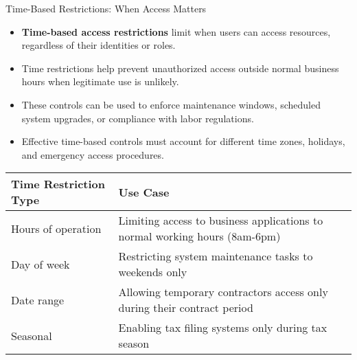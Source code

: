 \documentclass{beamer}
\begin{document}
\begin{frame}{Time-Based Restrictions: When Access Matters}
    \begin{itemize}
        \item \textbf{Time-based access restrictions} limit when users can access resources, regardless of their identities or roles.
        \item Time restrictions help prevent unauthorized access outside normal business hours when legitimate use is unlikely.
        \item These controls can be used to enforce maintenance windows, scheduled system upgrades, or compliance with labor regulations.
        \item Effective time-based controls must account for different time zones, holidays, and emergency access procedures.
    \end{itemize}
    
    \begin{table}
        \begin{tabular}{|l|p{7cm}|}
            \hline
            \textbf{Time Restriction Type} & \textbf{Use Case} \\
            \hline
            Hours of operation & Limiting access to business applications to normal working hours (8am-6pm) \\
            Day of week & Restricting system maintenance tasks to weekends only \\
            Date range & Allowing temporary contractors access only during their contract period \\
            Seasonal & Enabling tax filing systems only during tax season \\
            \hline
        \end{tabular}
    \end{table}
\end{frame}
\end{document}
